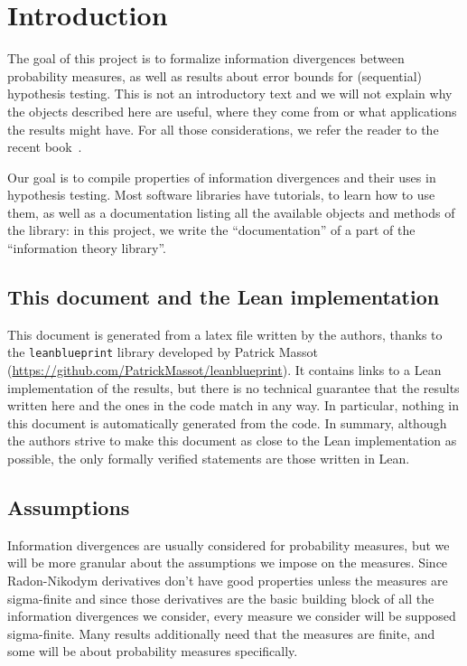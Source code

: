\chapter*{Introduction}

The goal of this project is to formalize information divergences between probability measures, as well as results about error bounds for (sequential) hypothesis testing.
This is not an introductory text and we will not explain why the objects described here are useful, where they come from or what applications the results might have. For all those considerations, we refer the reader to the recent book~\cite{polyanskiy2024information}.

Our goal is to compile properties of information divergences and their uses in hypothesis testing. Most software libraries have tutorials, to learn how to use them, as well as a documentation listing all the available objects and methods of the library: in this project, we write the ``documentation'' of a part of the ``information theory library''.



\section*{This document and the Lean implementation}

This document is generated from a latex file written by the authors, thanks to the \texttt{leanblueprint} library developed by Patrick Massot (\url{https://github.com/PatrickMassot/leanblueprint}). It contains links to a Lean implementation of the results, but there is no technical guarantee that the results written here and the ones in the code match in any way.
In particular, nothing in this document is automatically generated from the code.
In summary, although the authors strive to make this document as close to the Lean implementation as possible, the only formally verified statements are those written in Lean.



\section*{Assumptions}

Information divergences are usually considered for probability measures, but we will be more granular about the assumptions we impose on the measures.
Since Radon-Nikodym derivatives don't have good properties unless the measures are sigma-finite and since those derivatives are the basic building block of all the information divergences we consider, every measure we consider will be supposed sigma-finite.
Many results additionally need that the measures are finite, and some will be about probability measures specifically.

